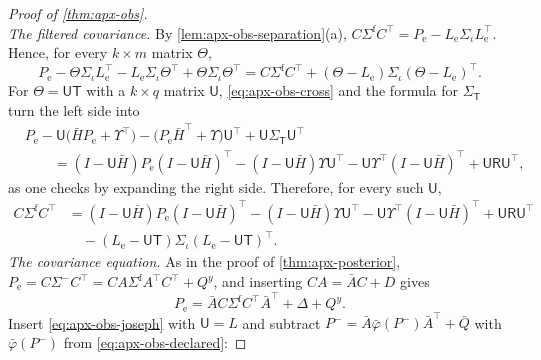 \begin{proof}[Proof of \cref{thm:apx-obs}]
\begin{equation*}
\end{equation*}
\emph{The filtered covariance.} By \cref{lem:apx-obs-separation}(a), $C\Sigma^{\mathrm f}C^\top=P_{\mathrm e}-L_{\mathrm e}\Sigma_\iota L_{\mathrm e}^\top$. Hence, for every $k\times m$ matrix $\Theta$,
\begin{equation*}
P_{\mathrm e}-\Theta\Sigma_\iota L_{\mathrm e}^\top-L_{\mathrm e}\Sigma_\iota\Theta^\top+\Theta\Sigma_\iota\Theta^\top=C\Sigma^{\mathrm f}C^\top+(\Theta-L_{\mathrm e})\Sigma_\iota(\Theta-L_{\mathrm e})^\top .
\end{equation*}
For $\Theta=\mathsf U\mathsf T$ with a $k\times q$ matrix $\mathsf U$, \eqref{eq:apx-obs-cross} and the formula for $\Sigma_{\mathsf T}$ turn the left side into
\begin{equation*}
\begin{aligned}
&P_{\mathrm e}-\mathsf U\bigl(\bar HP_{\mathrm e}+\Upsilon^\top\bigr)-\bigl(P_{\mathrm e}\bar H^\top+\Upsilon\bigr)\mathsf U^\top+\mathsf U\Sigma_{\mathsf T}\mathsf U^\top\\
&\qquad=(I-\mathsf U\bar H)P_{\mathrm e}(I-\mathsf U\bar H)^\top-(I-\mathsf U\bar H)\Upsilon\mathsf U^\top-\mathsf U\Upsilon^\top(I-\mathsf U\bar H)^\top+\mathsf U\mathsf R\mathsf U^\top ,
\end{aligned}
\end{equation*}
as one checks by expanding the right side. Therefore, for every such $\mathsf U$,
\begin{equation}\label{eq:apx-obs-joseph}
\begin{aligned}
C\Sigma^{\mathrm f}C^\top&=(I-\mathsf U\bar H)P_{\mathrm e}(I-\mathsf U\bar H)^\top-(I-\mathsf U\bar H)\Upsilon\mathsf U^\top-\mathsf U\Upsilon^\top(I-\mathsf U\bar H)^\top+\mathsf U\mathsf R\mathsf U^\top\\
&\quad-(L_{\mathrm e}-\mathsf U\mathsf T)\Sigma_\iota(L_{\mathrm e}-\mathsf U\mathsf T)^\top .
\end{aligned}
\end{equation}
\emph{The covariance equation.} As in the proof of \cref{thm:apx-posterior}, $P_{\mathrm e}=C\Sigma^-C^\top=CA\Sigma^{\mathrm f}A^\top C^\top+Q^y$, and inserting $CA=\bar AC+D$ gives
\begin{equation}\label{eq:apx-obs-fixed-point}
P_{\mathrm e}=\bar AC\Sigma^{\mathrm f}C^\top\bar A^\top+\Delta+Q^y .
\end{equation}
Insert \eqref{eq:apx-obs-joseph} with $\mathsf U=L$ and subtract $P^-=\bar A\bar\varphi(P^-)\bar A^\top+\bar Q$ with $\bar\varphi(P^-)$ from \eqref{eq:apx-obs-declared}:

\end{proof}
